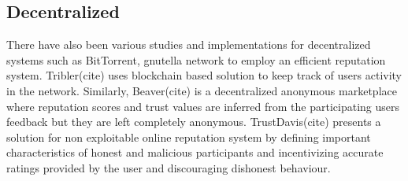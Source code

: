 \subsection{Decentralized}
There have also been various studies and implementations for decentralized systems 
such as BitTorrent, gnutella network to employ an efficient reputation system. 
Tribler(cite) uses blockchain based solution to keep track of users activity in the 
network. Similarly, Beaver(cite) is a decentralized anonymous marketplace where 
reputation scores and trust values are inferred from the participating users feedback 
but they are left completely anonymous. TrustDavis(cite) presents a solution for 
non exploitable online reputation system by defining important characteristics of 
honest and malicious participants and incentivizing accurate ratings provided by the 
user and discouraging dishonest behaviour.  


